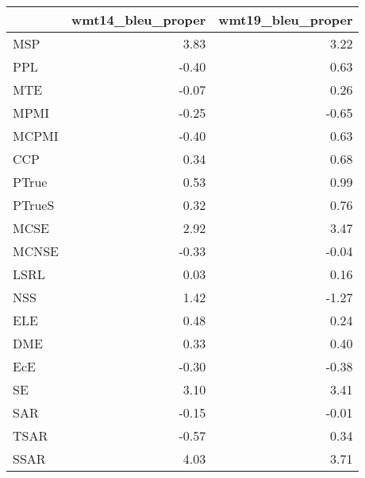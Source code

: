 \begin{tabular}{lrr}
\toprule
 & wmt14\_bleu\_proper & wmt19\_bleu\_proper \\
\midrule
MSP & 3.83 & 3.22 \\
PPL & -0.40 & 0.63 \\
MTE & -0.07 & 0.26 \\
MPMI & -0.25 & -0.65 \\
MCPMI & -0.40 & 0.63 \\
CCP & 0.34 & 0.68 \\
PTrue & 0.53 & 0.99 \\
PTrueS & 0.32 & 0.76 \\
MCSE & 2.92 & 3.47 \\
MCNSE & -0.33 & -0.04 \\
LSRL & 0.03 & 0.16 \\
NSS & 1.42 & -1.27 \\
ELE & 0.48 & 0.24 \\
DME & 0.33 & 0.40 \\
EcE & -0.30 & -0.38 \\
SE & 3.10 & 3.41 \\
SAR & -0.15 & -0.01 \\
TSAR & -0.57 & 0.34 \\
SSAR & 4.03 & 3.71 \\
\bottomrule
\end{tabular}
